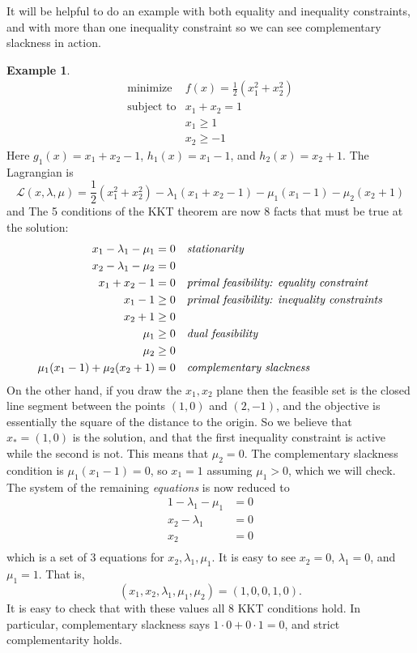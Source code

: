 \documentclass[11pt]{amsart}
\theoremstyle{definition}
\newtheorem*{example}{Example}
\begin{document}
It will be helpful to do an example with both equality and inequality constraints, and with more than one inequality constraint so we can see complementary slackness in action.

\begin{example}
    $$\begin{matrix}
    \text{minimize}   & f(x) = \frac{1}{2} \left(x_1^2 + x_2^2\right) \\
    \text{subject to} & x_1 + x_2 = 1 \\
                      & x_1 \ge 1 \\
                      & x_2 \ge -1
\end{matrix}$$
Here $g_1(x) = x_1 + x_2 -1$, $h_1(x) = x_1 - 1$, and $h_2(x) = x_2 + 1$.  The Lagrangian is
	$$\mathcal{L}(x,\lambda,\mu) = \frac{1}{2} \left(x_1^2 + x_2^2\right) - \lambda_1(x_1 + x_2 - 1) - \mu_1 (x_1 - 1) - \mu_2(x_2 + 1)$$
and 
The 5 conditions of the KKT theorem are now 8 facts that must be true at the solution:
\begin{align*}
x_1 - \lambda_1 - \mu_1 &= 0 &&\text{\emph{stationarity}} \\
x_2 - \lambda_1 - \mu_2 &= 0 \\
x_1 + x_2 -1 &= 0  &&\text{\emph{primal feasibility: equality constraint}} \\
x_1 - 1 &\ge 0  &&\text{\emph{primal feasibility: inequality constraints}} \\
x_2 + 1 &\ge 0 \\
\mu_1 &\ge 0 &&\text{\emph{dual feasibility}} \\
\mu_2 &\ge 0 \\
\mu_1 (x_1 - 1) + \mu_2 (x_2 + 1) &= 0 &&\text{\emph{complementary slackness}}
\end{align*}
On the other hand, if you draw the $x_1,x_2$ plane then the feasible set is the closed line segment between the points $(1,0)$ and $(2,-1)$, and the objective is essentially the square of the distance to the origin.  So we believe that $x_*=(1,0)$ is the solution, and that the first inequality constraint is active while the second is not.   This means that $\mu_2=0$.  The complementary slackness condition is $\mu_1 (x_1-1)=0$, so $x_1=1$ assuming $\mu_1>0$, which we will check.  The system of the remaining \emph{equations} is now reduced to
\begin{align*}
1 - \lambda_1 - \mu_1 &= 0 \\
x_2 - \lambda_1 &= 0 \\
x_2 &= 0 \\
\end{align*}
which is a set of 3 equations for $x_2,\lambda_1,\mu_1$.  It is easy to see $x_2=0$, $\lambda_1=0$, and $\mu_1=1$.  That is,
   $$(x_1,x_2,\lambda_1,\mu_1,\mu_2) = (1,0,0,1,0).$$
It is easy to check that with these values all 8 KKT conditions hold.  In particular, complementary slackness says $1 \cdot 0 + 0 \cdot 1 = 0$, and strict complementarity holds.
\end{example}
\end{document}
